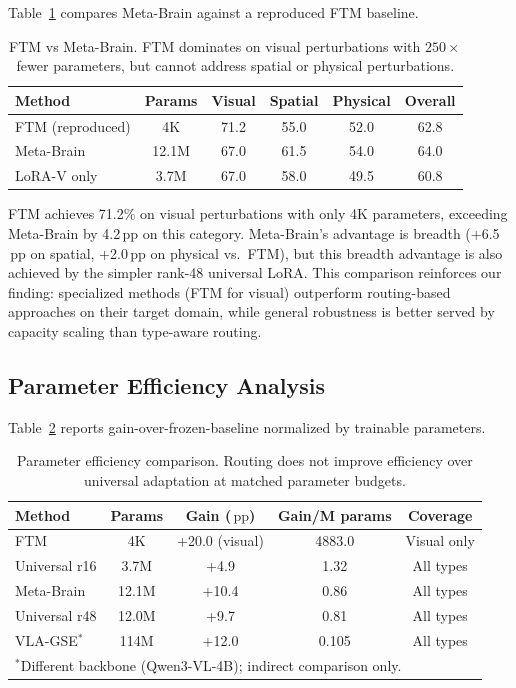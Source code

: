 \documentclass[letterpaper]{article}
\newcommand{\ours}{Meta-Brain}
\newcommand{\pp}{\,\text{pp}}
\begin{document}
Table~\ref{tab:ftm} compares \ours{} against a reproduced FTM baseline.

\begin{table}[h]
\centering
\caption{FTM vs \ours{}. FTM dominates on visual perturbations with $250\times$ fewer parameters, but cannot address spatial or physical perturbations.}
\label{tab:ftm}
\small
\begin{tabular}{lccccc}
\toprule
\textbf{Method} & \textbf{Params} & \textbf{Visual} & \textbf{Spatial} & \textbf{Physical} & \textbf{Overall} \\
\midrule
FTM (reproduced) & 4K & 71.2 & 55.0 & 52.0 & 62.8 \\
\ours{} & 12.1M & 67.0 & 61.5 & 54.0 & 64.0 \\
LoRA-V only & 3.7M & 67.0 & 58.0 & 49.5 & 60.8 \\
\bottomrule
\end{tabular}
\end{table}

FTM achieves 71.2\% on visual perturbations with only 4K parameters, exceeding \ours{} by 4.2$\pp$ on this category. \ours{}'s advantage is breadth (+6.5$\pp$ on spatial, +2.0$\pp$ on physical vs.\ FTM), but this breadth advantage is also achieved by the simpler rank-48 universal LoRA. This comparison reinforces our finding: specialized methods (FTM for visual) outperform routing-based approaches on their target domain, while general robustness is better served by capacity scaling than type-aware routing.

\subsection{Parameter Efficiency Analysis}
\label{sec:param_efficiency}

Table~\ref{tab:param_eff} reports gain-over-frozen-baseline normalized by trainable parameters.

\begin{table}[h]
\centering
\caption{Parameter efficiency comparison. Routing does not improve efficiency over universal adaptation at matched parameter budgets.}
\label{tab:param_eff}
\small
\begin{tabular}{lcccc}
\toprule
\textbf{Method} & \textbf{Params} & \textbf{Gain ($\pp$)} & \textbf{Gain/M params} & \textbf{Coverage} \\
\midrule
FTM & 4K & +20.0 (visual) & 4883.0 & Visual only \\
Universal r16 & 3.7M & +4.9 & 1.32 & All types \\
\ours{} & 12.1M & +10.4 & 0.86 & All types \\
Universal r48 & 12.0M & +9.7 & 0.81 & All types \\
VLA-GSE$^*$ & 114M & +12.0 & 0.105 & All types \\
\bottomrule
\multicolumn{5}{l}{\footnotesize $^*$Different backbone (Qwen3-VL-4B); indirect comparison only.}
\end{tabular}
\end{table}
\end{document}

